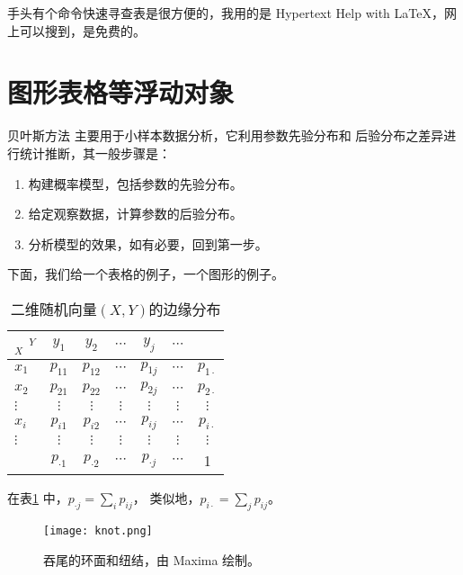 \documentclass[12pt,a4paper]{article}
\begin{document}
手头有个命令快速寻查表是很方便的，我用的是 Hypertext Help with \LaTeX，网上可以搜到，是免费的。

\section{图形表格等浮动对象}

贝叶斯方法\cite{Gelman} 主要用于小样本数据分析，它利用参数先验分布和
后验分布之差异进行统计推断，其一般步骤是：

\begin{enumerate}
 \item 构建概率模型，包括参数的先验分布。
 \item 给定观察数据，计算参数的后验分布。
 \item 分析模型的效果，如有必要，回到第一步。
\end{enumerate}

\begin{example}
下面，我们给一个表格的例子，一个图形的例子。

\begin{center}
\begin{table}[!ht]     %
\centering
\caption{二维随机向量$(X,Y)$的边缘分布}
\begin{tabular}{l|ccccc|c}
  $_X$\hspace{3mm} $^Y$&$y_1$&$y_2$&$\cdots$&$y_j$&$\cdots$\\
\hline
$x_1$   &$p_{11}$&$p_{12}$&$\cdots$&$p_{1j}$&$\cdots$&$p_{1\cdot}$\\
$x_2$   &$p_{21}$&$p_{22}$&$\cdots$&$p_{2j}$&$\cdots$&$p_{2\cdot}$\\
$\vdots$&$\vdots$&$\vdots$&$\vdots$&$\vdots$&$\vdots$&$\vdots$\\
$x_i$   &$p_{i1}$&$p_{i2}$&$\cdots$&$p_{ij}$&$\cdots$&$p_{i\cdot}$\\
$\vdots$&$\vdots$&$\vdots$&$\vdots$&$\vdots$&$\vdots$&$\vdots$\\
\hline
   &$p_{\cdot 1}$&$p_{\cdot 2}$&$\cdots$&$p_{\cdot j}$&$\cdots$&1
\label{marginal distribution}
\end{tabular}
\end{table}
\end{center}

在表\ref{marginal distribution} 中，$p_{\cdot j}=\sum\limits_i p_{ij}$，
类似地，$ p_{i\cdot}=\sum\limits_j p_{ij}$。
\end{example}

\begin{center}
\begin{figure}[!h]
\centering
\texttt{[image: knot.png]}
\caption{吞尾的环面和纽结，由 Maxima 绘制。\hfill\mbox{}}
\label{torus and knot}
\end{figure}
\end{center}
\end{document}
